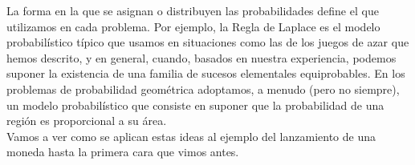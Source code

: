 La forma en la que se asignan o {\sf distribuyen} las probabilidades define el  que utilizamos en cada problema. Por ejemplo, la Regla de Laplace es el modelo probabilístico típico que usamos en situaciones como las de los juegos de azar que hemos descrito, y en general, cuando, basados en nuestra experiencia, podemos suponer la existencia de una familia de sucesos elementales equiprobables. En los problemas de probabilidad geométrica adoptamos, a menudo (pero no siempre), un modelo probabilístico que consiste en suponer que la probabilidad de una región es proporcional a su área. \\

Vamos a ver como se aplican estas ideas al ejemplo del lanzamiento de una moneda hasta la primera cara que vimos antes.
\begin{Ejemplo}\label{cap03:ejem:LanzamientoMonedaHastPrimeraCara:2}


\end{Ejemplo}
